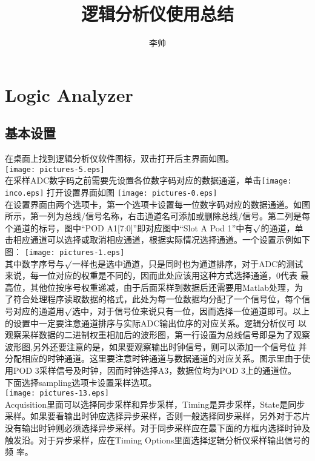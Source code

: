 \documentclass[a4paper]{ctexart}
\author{李帅}
\title{逻辑分析仪使用总结}
\begin{document}
  
\maketitle
\section{Logic Analyzer}
\subsection{基本设置}
\indent 在桌面上找到逻辑分析仪软件图标，双击打开后主界面如图。\\
\center
\texttt{[image: pictures-5.eps]}\\
\indent 在采样ADC数字码之前需要先设置各位数字码对应的数据通道，单击\texttt{[image: inco.eps]}
打开设置界面如图
\center
\texttt{[image: pictures-0.eps]}\\
在设置界面由两个选项卡，第一个选项卡设置每一位数字码对应的数据通道。如图所示，第一列为总线/信号名称，右击通道名可添加或删除总线/信号。第二列是每个通道的标号，图中“POD A1[7:0]”即对应图中“Slot A Pod 1”中有$\surd$的通道，单击相应通道可以选择或取消相应通道，根据实际情况选择通道。一个设置示例如下图：
\texttt{[image: pictures-1.eps]}\\
其中数字序号与$\surd$一样也是选中通道，只是同时也为通道排序，对于ADC的测试来说，每一位对应的权重是不同的，因而此处应该用这种方式选择通道，0代表
最高位，其他位按序号权重递减，由于后面采样到数据后还需要用Matlab处理，为了符合处理程序读取数据的格式，此处为每一位数据均分配了一个信号位，每个信
号对应的通道用$\surd$选中，对于信号位来说只有一位，因而选择一位通道即可。以上的设置中一定要注意通道排序与实际ADC输出位序的对应关系。逻辑分析仪可
以观察采样数据的二进制权重相加后的波形图，第一行设置为总线信号即是为了观察波形图,另外还要注意的是，如果要观察输出时钟信号，则可以添加一个信号位
并分配相应的时钟通道。这里要注意时钟通道与数据通道的对应关系。图示里由于使用POD 3采样信号及时钟，因而时钟选择A3，数据位均为POD 3上的通道位。\\
\indent 下面选择sampling选项卡设置采样选项。\\
\center
\texttt{[image: pictures-13.eps]}\\
Acquisition里面可以选择同步采样和异步采样，Timing是异步采样，State是同步采样。如果要看输出时钟应选择异步采样，否则一般选择同步采样，另外对于芯片
没有输出时钟则必须选择异步采样。对于同步采样应在最下面的方框内选择时钟及触发沿。对于异步采样，应在Timing Options里面选择逻辑分析仪采样输出信号的频
率。
\end{document}
